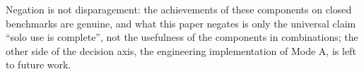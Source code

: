 Negation is not disparagement: the achievements of these components on closed benchmarks are genuine, and what this paper negates is only the universal claim ``solo use is complete'', not the usefulness of the components in combinations; the other side of the decision axis, the engineering implementation of Mode A, is left to future work.
